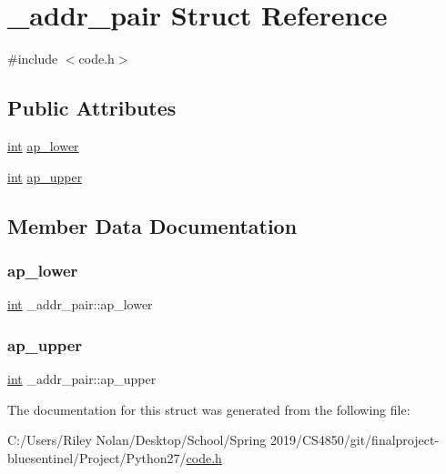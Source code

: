 \hypertarget{struct__addr__pair}{}\section{\+\_\+addr\+\_\+pair Struct Reference}
\label{struct__addr__pair}


{\ttfamily \#include $<$code.\+h$>$}

\subsection*{Public Attributes}
\begin{DoxyCompactItemize}
\item 
\mbox{\hyperlink{warnings_8h_a74f207b5aa4ba51c3a2ad59b219a423b}{int}} \mbox{\hyperlink{struct__addr__pair_a960425617377f631f14e81304a578238}{ap\+\_\+lower}}
\item 
\mbox{\hyperlink{warnings_8h_a74f207b5aa4ba51c3a2ad59b219a423b}{int}} \mbox{\hyperlink{struct__addr__pair_abfeb8a4b74168a0c24a9772b51b4bddb}{ap\+\_\+upper}}
\end{DoxyCompactItemize}


\subsection{Member Data Documentation}
\mbox{\label{struct__addr__pair_a960425617377f631f14e81304a578238}} 
\subsubsection{\texorpdfstring{ap\_lower}{ap\_lower}}
{\footnotesize\ttfamily \mbox{\hyperlink{warnings_8h_a74f207b5aa4ba51c3a2ad59b219a423b}{int}} \+\_\+addr\+\_\+pair\+::ap\+\_\+lower}

\mbox{\label{struct__addr__pair_abfeb8a4b74168a0c24a9772b51b4bddb}} 
\subsubsection{\texorpdfstring{ap\_upper}{ap\_upper}}
{\footnotesize\ttfamily \mbox{\hyperlink{warnings_8h_a74f207b5aa4ba51c3a2ad59b219a423b}{int}} \+\_\+addr\+\_\+pair\+::ap\+\_\+upper}



The documentation for this struct was generated from the following file\+:\begin{DoxyCompactItemize}
\item 
C\+:/\+Users/\+Riley Nolan/\+Desktop/\+School/\+Spring 2019/\+C\+S4850/git/finalproject-\/bluesentinel/\+Project/\+Python27/\mbox{\hyperlink{code_8h}{code.\+h}}\end{DoxyCompactItemize}
